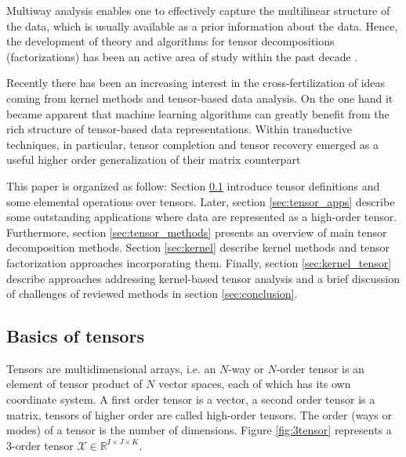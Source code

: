 \documentclass[letterpaper,12pt]{article}
\begin{document}
Multiway analysis enables one to effectively capture the multilinear structure of the data, which is usually available as a prior information about the data. Hence, the development of theory and algorithms for tensor decompositions (factorizations) has been an active area of study within the past decade  \cite{Kolda2009,Cichocki2015}.

Recently there has been an increasing interest in the cross-fertilization of ideas coming from kernel methods and tensor-based data analysis. On the one hand it became apparent that machine learning algorithms can greatly benefit from the rich structure of tensor-based data representations. %
Within transductive techniques, in particular, tensor completion and tensor recovery emerged as a useful higher order generalization of their matrix counterpart %

This paper is organized as follow: Section \ref{sec:basic_tensors} introduce tensor definitions and some elemental operations over tensors. Later, section \ref{sec:tensor_apps} describe some outstanding applications where data are represented as a high-order tensor. Furthermore,  section \ref{sec:tensor_methods} presents an overview of main tensor decomposition  methods. Section \ref{sec:kernel} describe kernel methods and tensor factorization approaches incorporating them. Finally, section \ref{sec:kernel_tensor} describe approaches addressing kernel-based tensor analysis and a brief discussion of challenges of reviewed methods in section \ref{sec:conclusion}.

\subsection{Basics of tensors}\label{sec:basic_tensors}

Tensors are multidimensional arrays, i.e. an $N$-way or $N$-order tensor is an element of tensor product of $N$ vector spaces, each of which has its own coordinate system. A first order tensor is a vector, a second order tensor is a matrix, tensors of higher order are called high-order tensors. The order (ways or modes) of a tensor is the number of dimensions. Figure \ref{fig:3tensor} represents a 3-order tensor $\mathcal{X}\in\mathbb{R}^{I\times J\times K}$.
\end{document}
